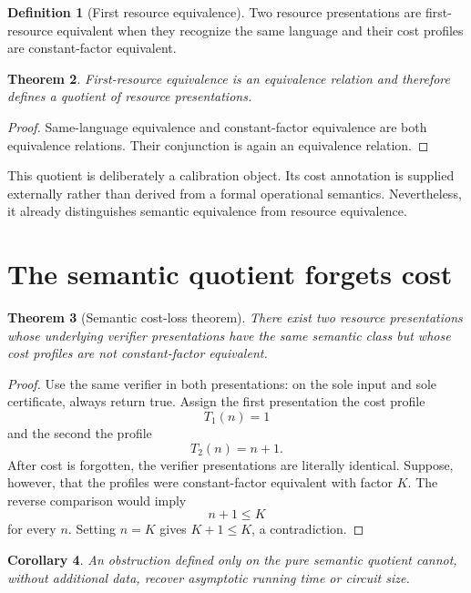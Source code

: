 \documentclass[11pt]{article}
\newtheorem{theorem}{Theorem}[section]
\newtheorem{corollary}[theorem]{Corollary}
\theoremstyle{definition}
\newtheorem{definition}[theorem]{Definition}
\begin{document}
\begin{definition}[First resource equivalence]
Two resource presentations are first-resource equivalent when they recognize
the same language and their cost profiles are constant-factor equivalent.
\end{definition}

\begin{theorem}
First-resource equivalence is an equivalence relation and therefore defines a
quotient of resource presentations.
\end{theorem}

\begin{proof}
Same-language equivalence and constant-factor equivalence are both equivalence
relations.  Their conjunction is again an equivalence relation.
\end{proof}

This quotient is deliberately a calibration object.  Its cost annotation is
supplied externally rather than derived from a formal operational semantics.
Nevertheless, it already distinguishes semantic equivalence from resource
equivalence.

\section{The semantic quotient forgets cost}

\begin{theorem}[Semantic cost-loss theorem]
There exist two resource presentations whose underlying verifier
presentations have the same semantic class but whose cost profiles are not
constant-factor equivalent.
\end{theorem}

\begin{proof}
Use the same verifier in both presentations: on the sole input and sole
certificate, always return true.  Assign the first presentation the cost
profile
\[
  T_1(n)=1
\]
and the second the profile
\[
  T_2(n)=n+1.
\]
After cost is forgotten, the verifier presentations are literally identical.
Suppose, however, that the profiles were constant-factor equivalent with
factor \(K\).  The reverse comparison would imply
\[
  n+1\le K
\]
for every \(n\).  Setting \(n=K\) gives \(K+1\le K\), a contradiction.
\end{proof}

\begin{corollary}
An obstruction defined only on the pure semantic quotient cannot, without
additional data, recover asymptotic running time or circuit size.
\end{corollary}
\end{document}
